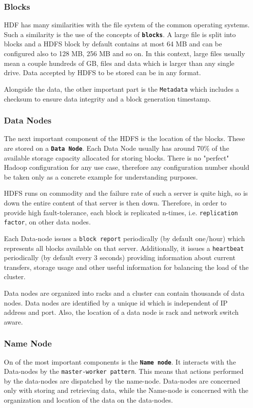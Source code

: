 \documentclass{sig-alternate}
\begin{document}
\subsubsection{Blocks}
HDF has many similarities with the file system of the common operating systems. Such a similarity is the use of the concepts of \textbf{\texttt{blocks}}.
A large file is split into blocks and a HDFS block by default contains at most 64 MB and can be configured also to 128 MB, 256 MB and so on.
In this context, large files usually mean a couple hundreds of GB, files and data which is larger than any single drive.
Data accepted by HDFS to be stored can be in any format.

Alongside the data, the other important part is the \texttt{Metadata} which includes a checksum to ensure data integrity and a block generation timestamp.

\subsubsection{Data Nodes}
The next important component of the HDFS is the location of the blocks. These are stored on a \textbf{\texttt{Data Node}}. Each Data Node usually has around 70\% of the available storage capacity allocated for storing blocks. There is no "perfect" Hadoop configuration for any use case, therefore any configuration number should be taken only as a concrete example for understanding purposes.

HDFS runs on commodity and the failure rate of such a server is quite high, so is down the entire content of that server is then down. 
Therefore, in order to provide high fault-tolerance, each block is replicated n-times, i.e. \texttt{replication factor}, on other data nodes.

Each Data-node issues a \texttt{block report} periodically (by default one/hour) which represents all blocks available on that server.
Additionally, it issues a \texttt{heartbeat} periodically (by default every 3 seconds) providing information about current transfers, storage usage and other useful information for balancing the load of the cluster.

Data nodes are organized into racks and a cluster can contain thousands of data nodes. Data nodes are identified by a unique id which is independent of IP address and port. Also, the location of a data node is rack and network switch aware.

\subsubsection{Name Node}
On of the most important components is the \textbf{\texttt{Name node}}.
It interacts with the Data-nodes by the \texttt{master-worker pattern}.
This means that actions performed by the data-nodes are dispatched by the name-node. Data-nodes are concerned only with storing and retrieving data, while the Name-node is concerned with the organization and location of the data on the data-nodes.
\end{document}
